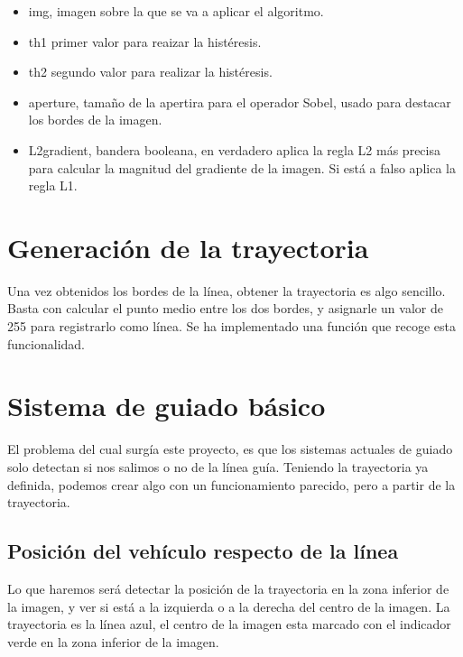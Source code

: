 \begin{itemize}

	\item img, imagen sobre la que se va a aplicar el algoritmo.
	
	\item th1 primer valor para reaizar la histéresis.
	
	\item th2 segundo valor para realizar la histéresis. 
	
	\item aperture, tamaño de la apertira para el operador Sobel, usado para destacar los bordes de la imagen.
	
	\item L2gradient, bandera booleana, en verdadero aplica la regla L2 más precisa para calcular la magnitud del gradiente de la imagen. Si está a falso aplica la regla L1.
	
\end{itemize}


\section{Generación de la trayectoria}
Una vez obtenidos los bordes de la línea, obtener la trayectoria es algo sencillo. Basta con calcular el punto medio entre los dos bordes, y asignarle un valor de 255 para registrarlo como línea. Se ha implementado una función que recoge esta funcionalidad. 


\section{Sistema de guiado básico}
El problema del cual surgía este proyecto, es que los sistemas actuales de guiado solo detectan si nos salimos o no de la línea guía. Teniendo la trayectoria ya definida, podemos crear algo con un funcionamiento parecido, pero a partir de la trayectoria. 


\subsection{Posición del vehículo respecto de la línea}
Lo que haremos será detectar la posición de la trayectoria en la zona inferior de la imagen, y ver si está a la izquierda o a la derecha del centro de la imagen. La trayectoria es la línea azul, el centro de la imagen esta marcado con el indicador verde en la zona inferior de la imagen.

